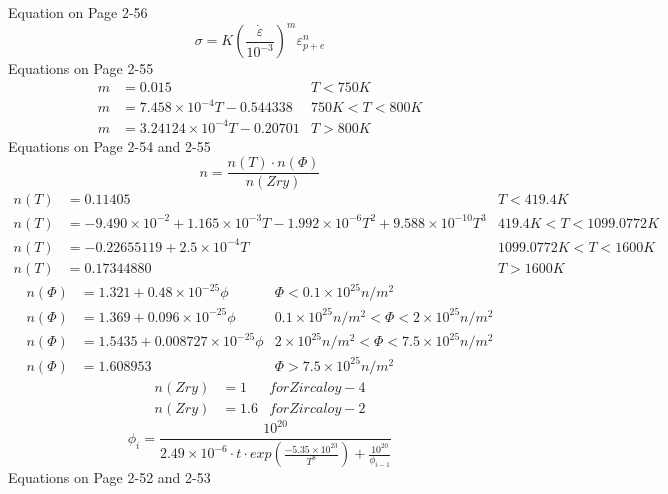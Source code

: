 \documentclass[12pt]{article}
\begin{document}
Equation on Page 2-56
\begin{equation}
\sigma = K \left( \frac{\dot{\varepsilon}}{10^{-3}} \right)^m \varepsilon_{p+e}^n
\end{equation}
Equations on Page 2-55
\begin{align}
m &=0.015 & T<750K\\
m &=7.458 \times 10^{-4}T-0.544338 & 750K<T<800K\\
m &=3.24124 \times 10^{-4}T-0.20701 & T>800K
\end{align}
Equations on Page 2-54 and 2-55
\begin{equation}
n= \frac{n(T)\cdot n(\Phi )}{n(Zry)}
\end{equation}
\begin{align}
n(T)&=0.11405 & T<419.4K\\
n(T)&=-9.490 \times 10^{-2}+1.165 \times 10^{-3}T-1.992 \times 10^{-6} T^2 +9.588 \times 10^{-10} T^3 & 419.4K<T<1099.0772K\\
n(T)&=-0.22655119+2.5 \times 10^{-4}T & 1099.0772K<T<1600K\\
n(T)&=0.17344880 & T>1600K
\end{align}
\begin{align}
n(\Phi )&=1.321+0.48 \times 10^{-25} \phi & \Phi<0.1 \times 10^{25} n/m^2\\
n(\Phi )&=1.369+0.096 \times 10^{-25} \phi & 0.1 \times 10^{25} n/m^2< \Phi<2 \times 10^{25} n/m^2\\
n(\Phi )&=1.5435+0.008727 \times 10^{-25} \phi & 2 \times 10^{25} n/m^2< \Phi<7.5 \times 10^{25} n/m^2\\
n(\Phi )&=1.608953 & \Phi>7.5 \times 10^{25} n/m^2
\end{align}
\begin{align}
n(Zry)&=1 & for Zircaloy-4 \\
n(Zry)&=1.6 & for Zircaloy-2
\end{align}
\begin{equation}
\phi_i=\frac{10^{20}}{2.49 \times 10^{-6} \cdot t\cdot exp \left( \frac{-5.35 \times 10^{23}}{T^8} \right)+ \frac{10^{20}}{\phi_{i-1}}}
\end{equation}
Equations on Page 2-52 and 2-53
\end{document}
